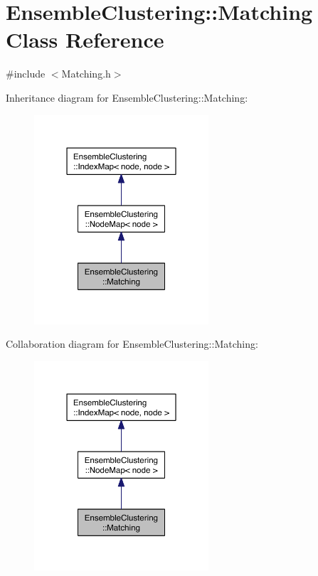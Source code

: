 \hypertarget{class_ensemble_clustering_1_1_matching}{\section{Ensemble\-Clustering\-:\-:Matching Class Reference}
\label{class_ensemble_clustering_1_1_matching}
}


{\ttfamily \#include $<$Matching.\-h$>$}



Inheritance diagram for Ensemble\-Clustering\-:\-:Matching\-:\nopagebreak
\begin{figure}[H]
\begin{center}
\leavevmode
\includegraphics[width=184pt]{class_ensemble_clustering_1_1_matching__inherit__graph}
\end{center}
\end{figure}


Collaboration diagram for Ensemble\-Clustering\-:\-:Matching\-:\nopagebreak
\begin{figure}[H]
\begin{center}
\leavevmode
\includegraphics[width=184pt]{class_ensemble_clustering_1_1_matching__coll__graph}
\end{center}
\end{figure}
